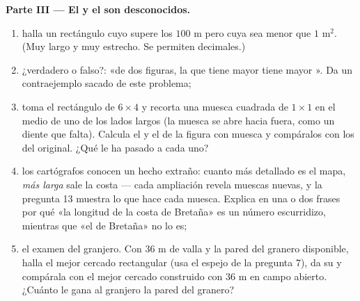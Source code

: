 \begin{problem}
\medskip
\noindent\textbf{Parte III --- El  y el  son desconocidos.}
\begin{enumerate}[resume]
  \item halla un rectángulo cuyo  supere los $100$ m pero
        cuya  sea menor que $1$ m$^2$. (Muy largo y muy
        estrecho. Se permiten decimales.)
  \item ¿verdadero o falso?: «de dos figuras, la que tiene mayor
         tiene mayor ». Da un contraejemplo
        sacado de este problema;
  \item toma el rectángulo de $6 \times 4$ y recorta una muesca cuadrada de
        $1 \times 1$ en el medio de uno de los lados largos (la muesca
        se abre hacia fuera, como un diente que falta). Calcula el 
        y el  de la figura con muesca y compáralos
        con los del original. ¿Qué le ha pasado a cada uno?
  \item los cartógrafos conocen un hecho extraño: cuanto más detallado es el mapa,
        \emph{más larga} sale la costa --- cada ampliación
        revela muescas nuevas, y la pregunta 13 muestra lo que hace
        cada muesca. Explica en una o dos frases por qué
        «la longitud de la costa de Bretaña» es un número
        escurridizo, mientras que «el  de Bretaña» no lo es;
  \item el examen del granjero. Con $36$ m de valla y la pared del
        granero disponible, halla el mejor cercado rectangular (usa el
        espejo de la pregunta 7), da su  y compárala con
        el mejor cercado construido con $36$ m en campo abierto. ¿Cuánto
        le gana al granjero la pared del granero?
\end{enumerate}
\end{problem}
